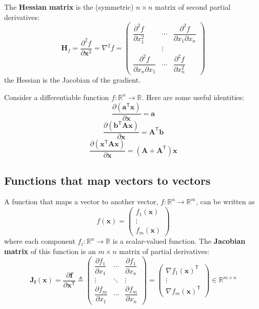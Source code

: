 \documentclass[11pt]{article}
\begin{document}
The \textbf{Hessian matrix} is the (symmetric) $n \times n$ matrix of second partial derivatives:
\[
\mathbf{H}_f = \frac{\partial^2 f}{\partial \boldsymbol{x}^2} = \nabla^2 f = \begin{pmatrix} \dfrac{\partial^2 f}{\partial x_1^2} & \cdots & \dfrac{\partial^2 f}{\partial x_1 \partial x_n} \\ & \vdots & \\ \dfrac{\partial^2 f}{\partial x_n \partial x_1} & \cdots & \dfrac{\partial^2 f}{\partial x_n^2} \end{pmatrix}
\]
the Hessian is the Jacobian of the gradient.

Consider a differentiable function $f: \mathbb{R}^n \to \mathbb{R}$. Here are some useful identities:
\[
\frac{\partial (\boldsymbol{a}^\mathsf{T} \boldsymbol{x})}{\partial \boldsymbol{x}} = \boldsymbol{a}
\]
\[
\frac{\partial (\boldsymbol{b}^\mathsf{T} \mathbf{A} \boldsymbol{x})}{\partial \boldsymbol{x}} = \mathbf{A}^\mathsf{T} \boldsymbol{b}
\]
\[
\frac{\partial (\boldsymbol{x}^\mathsf{T} \mathbf{A} \boldsymbol{x})}{\partial \boldsymbol{x}} = (\mathbf{A} + \mathbf{A}^\mathsf{T}) \boldsymbol{x}
\]

\subsection{Functions that map vectors to vectors}
A function that maps a vector to another vector, $f : \mathbb{R}^n \to \mathbb{R}^m$, can be written as
\[
f(\boldsymbol{x}) = \begin{pmatrix} f_1(\boldsymbol{x}) \\ \vdots \\ f_m(\boldsymbol{x}) \end{pmatrix}
\]
where each component $f_i : \mathbb{R}^n \to \mathbb{R}$ is a scalar-valued function. The \textbf{Jacobian matrix} of this function is an $m \times n$ matrix of partial derivatives:
\[
\mathbf{J}_{\boldsymbol{f}}(\boldsymbol{x}) = \frac{\partial \boldsymbol{f}}{\partial \boldsymbol{x}^\mathsf{T}} \triangleq \begin{pmatrix} \dfrac{\partial f_1}{\partial x_1} & \cdots & \dfrac{\partial f_1}{\partial x_n} \\ \vdots & \ddots & \vdots \\ \dfrac{\partial f_m}{\partial x_1} & \cdots & \dfrac{\partial f_m}{\partial x_n} \end{pmatrix} = \begin{pmatrix} \nabla f_1(\boldsymbol{x})^\mathsf{T} \\ \vdots \\ \nabla f_m(\boldsymbol{x})^\mathsf{T} \end{pmatrix}
\in \mathbb{R}^{m \times n}
\]
\end{document}
